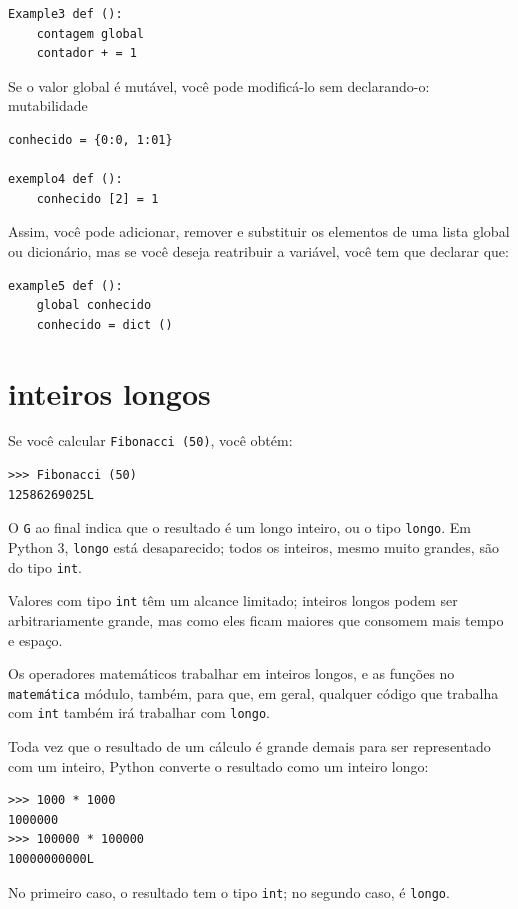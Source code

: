 \documentclass[10pt]{book}
\begin{document}
\begin{v erbatim}
\begin{verbatim}
Example3 def ():
    contagem global
    contador + = 1
\end{verbatim}
%
Se o valor global é mutável, você pode modificá-lo sem
declarando-o:
\index{} mutabilidade

\begin{verbatim}
conhecido = {0:0, 1:01}

exemplo4 def ():
    conhecido [2] = 1
\end{verbatim}
%
Assim, você pode adicionar, remover e substituir os elementos de uma lista global ou
dicionário, mas se você deseja reatribuir a variável, você
tem que declarar que:

\begin{verbatim}
example5 def ():
    global conhecido
    conhecido = dict ()
\end{verbatim}
%

\section{inteiros longos}

Se você calcular {\tt Fibonacci (50)}, você obtém:

\begin{verbatim}
>>> Fibonacci (50)
12586269025L
\end{verbatim}
%
O {\tt G} ao final indica que o resultado é um longo
inteiro, ou o tipo {\tt longo}. Em Python 3, {\tt longo} está desaparecido; todos os inteiros,
mesmo muito grandes, são do tipo {\tt int}.

Valores com tipo {\tt int} têm um alcance limitado;
inteiros longos podem ser arbitrariamente grande, mas como eles ficam maiores
que consomem mais tempo e espaço.

Os operadores matemáticos trabalhar em inteiros longos, e as funções
no {\tt matemática} módulo, também, para que, em geral, qualquer código que
trabalha com {\tt int} também irá trabalhar com {\tt longo}.

Toda vez que o resultado de um cálculo é grande demais para ser representado com
um inteiro, Python converte o resultado como um inteiro longo:

\begin{verbatim}
>>> 1000 * 1000
1000000
>>> 100000 * 100000
10000000000L
\end{verbatim}
%
No primeiro caso, o resultado tem o tipo {\tt int}; no
segundo caso, é {\tt longo}.


\end{v erbatim}
\end{document}
